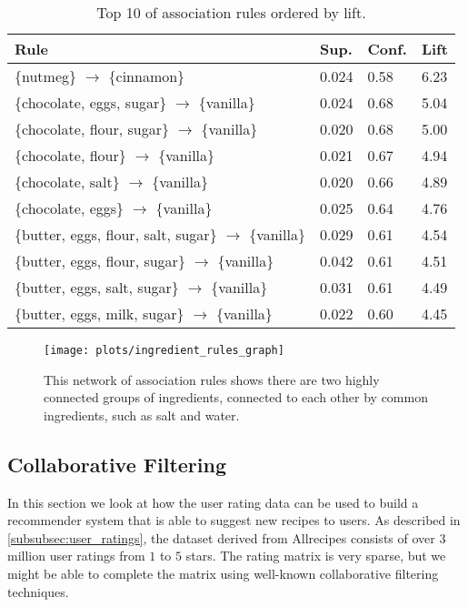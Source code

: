 \begin{table}[htbp]
	\caption{Top 10 of association rules ordered by lift.}
	\label{tab:rules_top10}
	
	\centering
	\begin{tabular}{l l l l}
		\toprule
		\textbf{Rule} & \textbf{Sup.} & \textbf{Conf.} & \textbf{Lift} \\
		\midrule
		\{nutmeg\} $\rightarrow$ \{cinnamon\} & 0.024 & 0.58 & 6.23 \\
		\{chocolate, eggs, sugar\} $\rightarrow$ \{vanilla\} & 0.024 & 0.68 & 5.04 \\
		\{chocolate, flour, sugar\} $\rightarrow$ \{vanilla\} & 0.020 & 0.68 & 5.00 \\
		\{chocolate, flour\} $\rightarrow$ \{vanilla\} & 0.021 & 0.67 & 4.94 \\
		\{chocolate, salt\} $\rightarrow$ \{vanilla\} & 0.020 & 0.66 & 4.89 \\
		\{chocolate, eggs\} $\rightarrow$ \{vanilla\} & 0.025 & 0.64 & 4.76 \\
		\{butter, eggs, flour, salt, sugar\} $\rightarrow$ \{vanilla\} & 0.029 & 0.61 & 4.54 \\
		\{butter, eggs, flour, sugar\} $\rightarrow$ \{vanilla\} & 0.042 & 0.61 & 4.51 \\
		\{butter, eggs, salt, sugar\} $\rightarrow$ \{vanilla\} & 0.031 & 0.61 & 4.49 \\
		\{butter, eggs, milk, sugar\} $\rightarrow$ \{vanilla\} & 0.022 & 0.60 & 4.45 \\
		\bottomrule
	\end{tabular}
	
\end{table}

\begin{figure}[htbp]
		
\end{figure}


\begin{figure}[htbp]
	\centering

	\texttt{[image: plots/ingredient\_rules\_graph]}
	
	\caption{This network of association rules shows there are two highly connected groups of ingredients, connected to each other by common ingredients, such as salt and water.}
	\label{fig:ingredient_rules_graph}
\end{figure}




\subsection{Collaborative Filtering}
\label{subsec:collaborative_filtering}

In this section we look at how the user rating data can be used to build a recommender system that is able to suggest new recipes to users.
As described in \cref{subsubsec:user_ratings}, the dataset derived from Allrecipes consists of over $3$ million user ratings from $1$ to $5$ stars.
The rating matrix is very sparse, but we might be able to complete the matrix using well-known collaborative filtering techniques.

